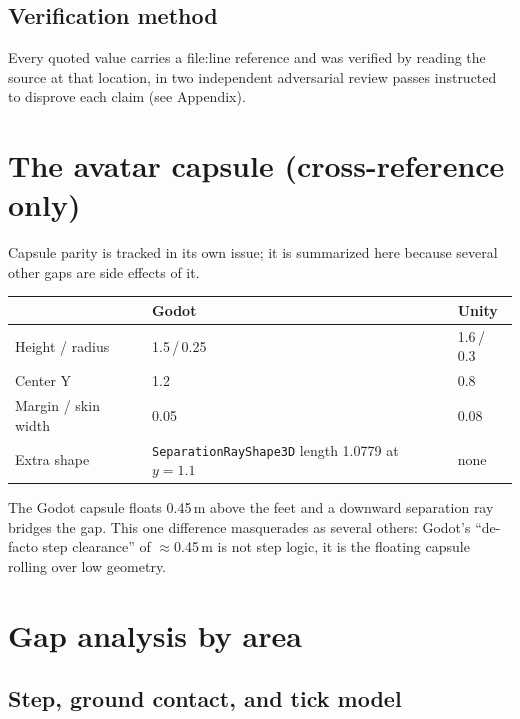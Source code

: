 \documentclass[11pt]{article}
\newcommand{\code}[1]{\texttt{\small #1}}
\newcommand{\godot}{\textbf{Godot}}
\newcommand{\unity}{\textbf{Unity}}
\begin{document}
\subsection{Verification method}

Every quoted value carries a file:line reference and was verified by reading the source
at that location, in two independent adversarial review passes instructed to disprove
each claim (see Appendix).

\section{The avatar capsule (cross-reference only)}

Capsule parity is tracked in its own issue; it is summarized here because several other
gaps are side effects of it.

\begin{center}
\begin{tabular}{@{}l L{4.6cm} L{4.6cm}@{}}
\toprule
 & \godot & \unity \\
\midrule
Height / radius & 1.5\,/\,0.25 & 1.6\,/\,0.3 \\
Center Y & 1.2 & 0.8 \\
Margin / skin width & 0.05 & 0.08 \\
Extra shape & \code{SeparationRayShape3D} length 1.0779 at $y{=}1.1$ & none \\
\bottomrule
\end{tabular}
\end{center}

The Godot capsule floats 0.45\,m above the feet and a downward separation ray bridges the
gap. This one difference masquerades as several others: Godot's ``de-facto step
clearance'' of $\approx$0.45\,m is not step logic, it is the floating capsule rolling over
low geometry.

\section{Gap analysis by area}

\subsection{Step, ground contact, and tick model}
\end{document}
